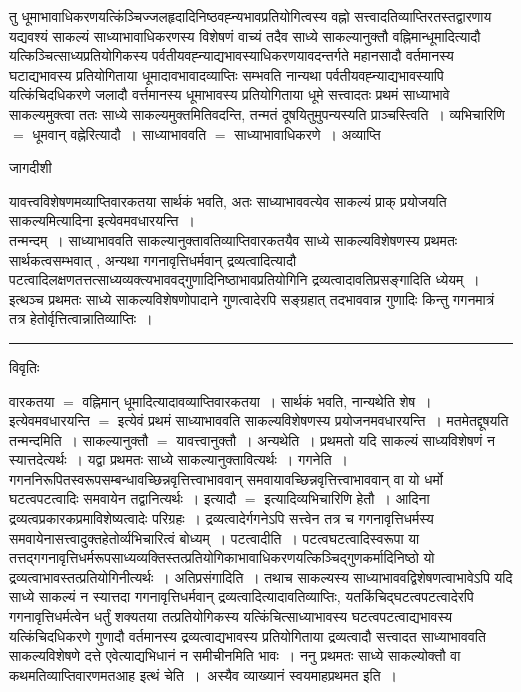 \documentclass[10pt, openany]{book}
\begin{document}
{तु धूमाभावाधिकरणयत्किंञ्चिज्जलहृदादिनिष्ठवह्न्यभावप्रतियोगित्वस्य वह्नो सत्त्वादतिव्याप्तिरतस्तद्वारणाय यद्यवश्यं साकल्यं साध्याभावाधिकरणस्य विशेषणं
वाच्यं तदैव साध्ये साकल्यानुक्तौ वह्निमान्धूमादित्यादौ यत्किञ्चित्साध्यप्रतियोगिकस्य पर्वतीयवह्न्याद्यभावस्याधिकरणयावदन्तर्गते महानसादौ वर्तमानस्य घटाद्यभावस्य प्रतियोगिताया धूमादावभावादव्याप्तिः सम्भवति नान्यथा पर्वतीयवह्न्याद्यभावस्यापि यत्किंचिदधिकरणे जलादौ वर्त्तमानस्य धूमाभावस्य प्रतियोगिताया धूमे सत्त्वादतः प्रथमं साध्याभावे साकल्यमुक्त्वा ततः साध्ये साकल्यमुक्तमितिवदन्ति, तन्मतं दूषयितुमुपन्यस्यति प्राञ्चस्त्विति~। व्यभिचारिणि $=$ धूमवान् वह्नेरित्यादौ~। साध्याभाववति $=$ साध्याभावाधिकरणे~। अव्याप्ति
\newpage
\lfoot{}
\begin{center} जागदीशी \end{center}
{\la यावत्त्वविशेषणमव्याप्तिवारकतया सार्थकं भवति, अतः साध्याभाववत्येव साकल्यं प्राक् प्रयोजयति {\qt साकल्यमित्यादिना} इत्येवमवधारयन्ति~।\\

तन्मन्दम्~। साध्याभाववति साकल्यानुक्तावतिव्याप्तिवारकतयैव साध्ये साकल्यविशेषणस्य प्रथमतः सार्थकत्वसम्भवात् , अन्यथा गगनावृत्तिधर्मवान् द्रव्यत्वादित्यादौ
पटत्वादिलक्षणतत्तत्साध्यव्यक्त्यभाववद्गुणादिनिष्ठाभावप्रतियोगिनि द्रव्यत्वादावतिप्रसङ्गादिति ध्येयम्~। इत्थञ्च प्रथमतः साध्ये साकल्यविशेषणोपादाने गुणत्वादेरपि सङ्ग्रहात् तदभाववान्न गुणादिः किन्तु गगनमात्रं तत्र हेतोर्वृत्तित्वान्नातिव्याप्तिः~।}\\
\hrule
\begin{center}     विवृतिः \end{center}
वारकतया $=$ वह्निमान् धूमादित्यादावव्याप्तिवारकतया~। सार्थकं भवति, नान्यथेति शेष~। इत्येवमवधारयन्ति $=$ इत्येवं प्रथमं साध्याभाववति साकल्यविशेषणस्य
प्रयोजनमवधारयन्ति~। मतमेतद्दूषयति तन्मन्दमिति~। साकल्यानुक्तौ $=$ यावत्त्वानुक्तौ~। अन्यथेति~। प्रथमतो यदि साकल्यं साध्यविशेषणं न स्यात्तदेत्यर्थः~।
यद्वा प्रथमतः साध्ये साकल्यानुक्तावित्यर्थः~। गगनेति~। गगननिरूपितस्वरूपसम्बन्धावच्छिन्नवृत्तित्त्वाभाववान् समवायावच्छिन्नवृत्तित्त्वाभाववान् वा यो धर्मो घटत्वपटत्वादिः समवायेन तद्वानित्यर्थः~। इत्यादौ $=$ इत्यादिव्यभिचारिणि हेतौ~। आदिना द्रव्यत्वप्रकारकप्रमाविशेष्यत्वादेः परिग्रहः~। द्रव्यत्वादेर्गगनेऽपि सत्त्वेन तत्र च गगनावृत्तिधर्मस्य समवायेनासत्त्वादुक्तहेतोर्व्यभिचारित्वं बोध्यम्~। पटत्वादीति~। पटत्वघटत्वादिस्वरूपा या
तत्तद्गगनावृत्तिधर्मरूपसाध्यव्यक्तिस्तत्प्रतियोगिकाभावाधिकरणयत्किञ्चिद्गुणकर्मादिनिष्ठो यो द्रव्यत्वाभावस्तत्प्रतियोगिनीत्यर्थः~। अतिप्रसंगादिति~। तथाच साकल्यस्य साध्याभाववद्विशेषणत्वाभावेऽपि यदि साध्ये साकल्यं न स्यात्तदा गगनावृत्तिधर्मवान् द्रव्यत्वादित्यादावतिव्याप्तिः, यतकिंचिद्घटत्वपटत्वादेरपि गगनावृत्तिधर्मत्वेन धर्तुं
शक्यतया तत्प्रतियोगिकस्य यत्किंचित्साध्याभावस्य घटत्वपटत्वाद्यभावस्य यत्किंचिदधिकरणे गुणादौ वर्तमानस्य द्रव्यत्वाद्यभावस्य प्रतियोगिताया द्रव्यत्वादौ सत्त्वादत साध्याभाववति साकल्यविशेषणे दत्ते एवेत्याद्यभिधानं न समीचीनमिति भावः~। ननु प्रथमतः साध्ये साकल्योक्तौ वा कथमतिव्याप्तिवारणमतआह\textendash 
{\la इत्थं चेति~।}~अस्यैव व्याख्यानं स्वयमाह\textendash प्रथमत इति~।\\

}
\end{document}

